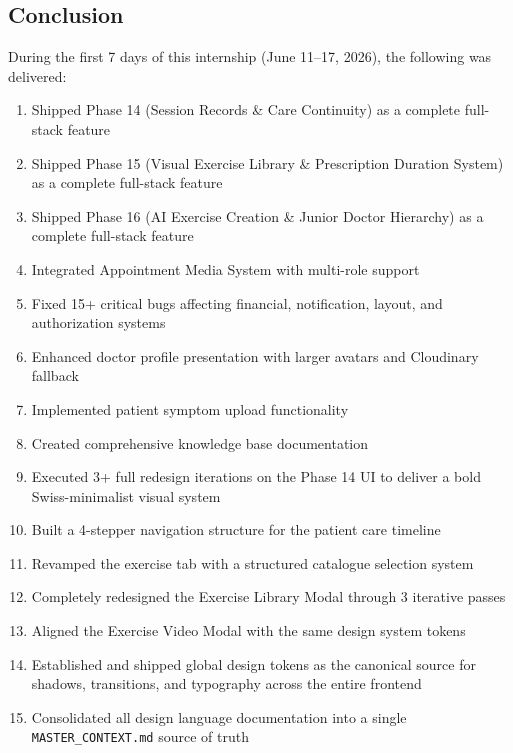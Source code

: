 \documentclass[11pt,a4paper]{article}
\begin{document}
\begin{itemize}
{\newpage

\section{Conclusion}

During the first 7 days of this internship (June 11--17, 2026), the following was
delivered:

\begin{enumerate}
  \item Shipped Phase 14 (Session Records \& Care Continuity) as a complete full-stack feature
  \item Shipped Phase 15 (Visual Exercise Library \& Prescription Duration System) as a complete full-stack feature
  \item Shipped Phase 16 (AI Exercise Creation \& Junior Doctor Hierarchy) as a complete full-stack feature
  \item Integrated Appointment Media System with multi-role support
  \item Fixed 15+ critical bugs affecting financial, notification, layout, and authorization systems
  \item Enhanced doctor profile presentation with larger avatars and Cloudinary fallback
  \item Implemented patient symptom upload functionality
  \item Created comprehensive knowledge base documentation
  \item Executed 3+ full redesign iterations on the Phase 14 UI to deliver a bold
        Swiss-minimalist visual system
  \item Built a 4-stepper navigation structure for the patient care timeline
  \item Revamped the exercise tab with a structured catalogue selection system
  \item Completely redesigned the Exercise Library Modal through 3 iterative passes
  \item Aligned the Exercise Video Modal with the same design system tokens
  \item Established and shipped global design tokens as the canonical source for shadows,
        transitions, and typography across the entire frontend
  \item Consolidated all design language documentation into a single
        \texttt{MASTER\_CONTEXT.md} source of truth

\end{enumerate}}
\end{itemize}
\end{document}
